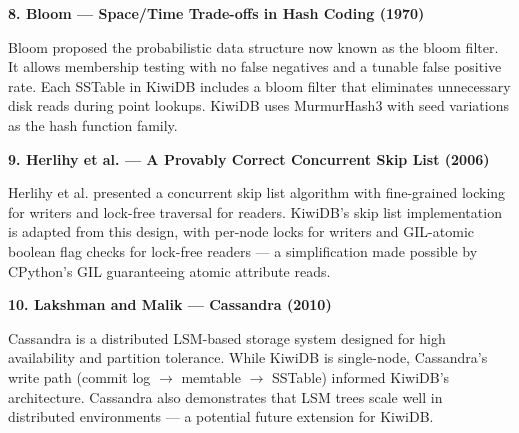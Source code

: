 \documentclass[oneside,a4paper,12pt]{book}
\begin{document}
\textbf{8. Bloom --- Space/Time Trade-offs in Hash Coding (1970) \cite{c13}}

Bloom proposed the probabilistic data structure now known as the bloom filter. It allows membership testing with no false negatives and a tunable false positive rate. Each SSTable in KiwiDB includes a bloom filter that eliminates unnecessary disk reads during point lookups. KiwiDB uses MurmurHash3 with seed variations as the hash function family.

\vspace{1\baselineskip}

\textbf{9. Herlihy et al. --- A Provably Correct Concurrent Skip List (2006) \cite{c14}}

Herlihy et al. presented a concurrent skip list algorithm with fine-grained locking for writers and lock-free traversal for readers. KiwiDB's skip list implementation is adapted from this design, with per-node locks for writers and GIL-atomic boolean flag checks for lock-free readers --- a simplification made possible by CPython's GIL guaranteeing atomic attribute reads.

\vspace{1\baselineskip}

\textbf{10. Lakshman and Malik --- Cassandra (2010) \cite{c3}}

Cassandra is a distributed LSM-based storage system designed for high availability and partition tolerance. While KiwiDB is single-node, Cassandra's write path (commit log $\rightarrow$ memtable $\rightarrow$ SSTable) informed KiwiDB's architecture. Cassandra also demonstrates that LSM trees scale well in distributed environments --- a potential future extension for KiwiDB.



\end{document}
